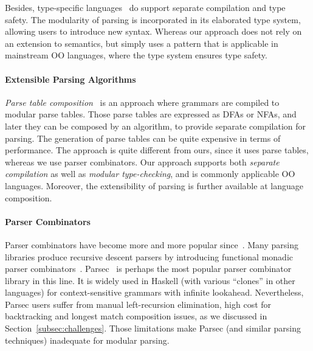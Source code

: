 Besides, type-specific languages~\cite{omar14} do support
separate compilation and type safety. The modularity of parsing is incorporated in its elaborated type
system, allowing users to introduce new syntax. Whereas our approach does not rely on an extension to semantics, but simply uses a pattern
that is applicable in mainstream OO languages, where the type system ensures
type safety.


\vspace{-6pt}
\paragraph{Extensible Parsing Algorithms}
\textit{Parse table composition}~\cite{bravenboer2008parse, schwerdfeger2010}
is an approach where grammars are compiled to
modular parse tables. Those parse tables are expressed as DFAs
or NFAs, and later they can be composed by an algorithm, to provide
separate compilation for parsing. The generation of parse tables can
be quite expensive in terms of performance. The approach
is quite different from ours, since it uses parse
 tables, whereas we use parser combinators.
Our approach supports both
\emph{separate compilation} as well as \emph{modular
  type-checking}, and is commonly applicable OO languages. Moreover, the extensibility of parsing is further
available at language composition.


\vspace{-5pt}
\paragraph{Parser Combinators} Parser combinators have become more and more
popular since~\cite{burge1975,Wadler1985}. Many parsing libraries produce recursive descent
parsers by introducing functional monadic
parser combinators~\cite{nott237}. Parsec~\cite{Leijen2001} is
perhaps the most popular parser combinator library in this line.
It is widely used in Haskell (with various ``clones'' in other languages)
for context-sensitive grammars with infinite lookahead. Nevertheless,
Parsec users suffer from manual left-recursion elimination,
high cost for backtracking and longest match composition issues,
as we discussed in Section~\ref{subsec:challenges}. Those limitations make Parsec
(and similar parsing techniques) inadequate for modular parsing.

